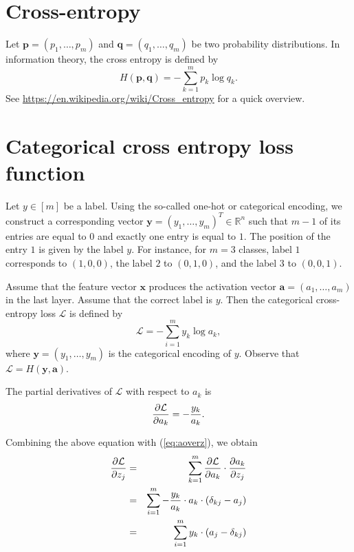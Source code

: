\documentclass[12pt]{article}
\newcommand{\R}{\mathbb{R}}
\newcommand{\x}{\boldsymbol{x}}
\newcommand{\y}{\boldsymbol{y}}
\begin{document}
\section{Cross-entropy}

Let $\boldsymbol{p}=(p_1,\ldots,p_m)$ and $\boldsymbol{q}=(q_1,\ldots,q_m)$ be two probability distributions. In information theory, the cross entropy is defined by
\begin{equation}
H(\boldsymbol{p},\boldsymbol{q}) = - \sum_{k=1}^m p_k \log q_k.
\end{equation}
See \url{https://en.wikipedia.org/wiki/Cross_entropy} for a quick overview.

\section{Categorical cross entropy loss function}

Let $y\in[m]$ be a label. Using the so-called one-hot or categorical encoding, we construct a corresponding vector $\boldsymbol{y}=(y_1,\ldots,y_m)^T\in\R^n$ such that $m-1$ of its entries are equal to $0$ and exactly one entry is equal to $1$. The position of the entry $1$ is given by the label $y$. For instance, for $m=3$ classes, label $1$ corresponds to $(1,0,0)$, the label $2$ to $(0,1,0)$, and the label $3$ to $(0,0,1)$.

Assume that the feature vector $\x$ produces the activation vector $\boldsymbol{a}=(a_1,\ldots,a_m)$ in the last layer. Assume that the correct label is $y$. Then the categorical cross-entropy loss $\mathcal{L}$ is defined by
\begin{equation}
\mathcal{L} = -\sum_{i=1}^m y_k \log a_k,
\end{equation}
where $\y=(y_1,\ldots,y_m)$ is the categorical encoding of $y$. Observe that $\mathcal{L}=H(\y,\boldsymbol{a})$.

The partial derivatives of $\mathcal{L}$ with respect to $a_k$ is
\begin{equation}
{\partial \mathcal{L} \over \partial a_k} = -\frac{y_k}{a_k}.
\end{equation}

Combining the above equation with (\ref{eq:aoverz}), we obtain
\begin{eqnarray}
{\partial \mathcal{L} \over \partial z_j} 
& = &
\sum_{k=1}^m {\partial \mathcal{L} \over \partial a_k} \cdot {\partial a_k \over \partial z_j} \\
& = &
\sum_{i=1}^m -\frac{y_k}{a_k} \cdot a_k \cdot (\delta_{kj} - a_j)  \\
& = &
\sum_{i=1}^m y_k \cdot (a_j - \delta_{kj})
\end{eqnarray}
\end{document}
